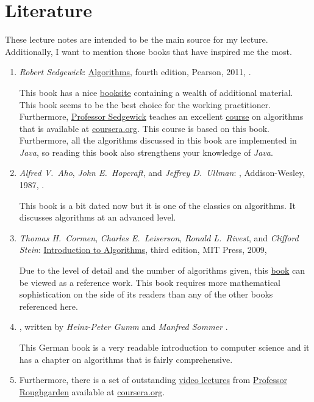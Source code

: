 \section{Literature}
These lecture notes are intended to be the main source for my lecture.  Additionally, I want
to mention those books that have inspired me the most.
\begin{enumerate}
\item \textsl{Robert Sedgewick}: \href{https://www.amazon.com/Algorithms-4th-Robert-Sedgewick/dp/032157351X}{Algorithms}, 
      fourth edition, Pearson, 2011, \cite{sedgewick:11}.
    
      This book has a nice \href{http://algs4.cs.princeton.edu/home/}{booksite} containing a wealth
      of additional material.  This book seems to be the best choice for the working practitioner.
      Furthermore, \href{http://www.cs.princeton.edu/~rs/}{Professor Sedgewick} teaches an excellent 
      \href{https://www.coursera.org/course/algs4partI}{course} on algorithms that is available at
      \href{https://www.coursera.org/}{coursera.org}.  This course is based on this book.  Furthermore, all
      the algorithms discussed in this book are implemented in \textsl{Java}, so reading this book
      also strengthens your knowledge of \textsl{Java}.
\item \textsl{Alfred V.~Aho}, \textsl{John E.~Hopcraft}, and \textsl{Jeffrey D.~Ullman}:
      , Addison-Wesley, 1987, \cite{aho:87}.
      
      This book is a bit dated now but it is one of the classics on algorithms.  It discusses algorithms at an
      advanced level.
\item \textsl{Thomas H.~Cormen}, \textsl{Charles E.~Leiserson}, 
      \textsl{Ronald L.~Rivest}, and \textsl{Clifford Stein}:
      \href{https://www.amazon.com/Introduction-Algorithms-3rd-MIT-Press/dp/0262033844}{Introduction to Algorithms}, 
      third edition, MIT Press, 2009, \cite{cormen:09}

      Due to the level of detail and the number of algorithms given, this
      \href{https://en.wikipedia.org/wiki/Introduction_to_Algorithms}{book} can be viewed as a reference work. 
      This book requires more mathematical sophistication on the side of its readers than any of the
      other books referenced here.  
\item {},
      written by \textsl{Heinz-Peter Gumm} and \textsl{Manfred Sommer} \cite{gumm:2013}.
      
      This German book is a very readable introduction to computer science and it has a chapter
      on algorithms that is fairly comprehensive.  
\item Furthermore, there is a set of outstanding 
      \href{https://class.coursera.org/algo-004/class/index}{video lectures} 
      from \href{http://theory.stanford.edu/~tim/}{Professor Roughgarden}
      available at \href{https://www.coursera.org/}{coursera.org}.
\end{enumerate}


